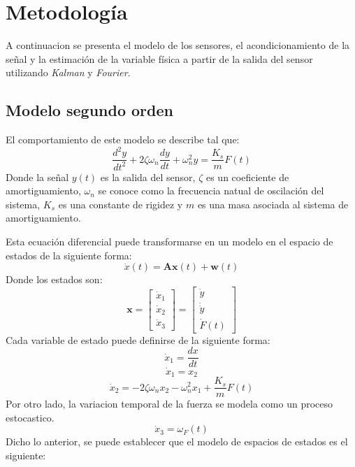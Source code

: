 \documentclass[conference]{IEEEtran}
\begin{document}
\section{Metodolog\'ia}

A continuacion se presenta el modelo de los sensores, el acondicionamiento de la se\~nal 
y la estimaci\'on de la variable f\'isica a partir de la salida del sensor utilizando \textit{Kalman} y \textit{Fourier}.


\subsection{Modelo segundo orden}


El comportamiento de este modelo se describe tal que:
\begin{equation}
	\frac{d^2y}{dt^2} + 2\zeta\omega_n \frac{dy}{dt} + \omega_n^2 y = \frac{K_s}{m} F(t)
\end{equation}
Donde la se\~nal $y(t)$ es la salida del sensor, $\zeta$ es un coeficiente de amortiguamiento, $\omega_n$ se conoce como la frecuencia natual de oscilaci\'on del sistema, ${K_s}$ es una constante de rigidez y $m$ es una masa asociada al sistema de amortiguamiento.

Esta ecuaci\'on diferencial puede transformarse en un modelo en el espacio de estados de la siguiente forma:
\[
\dot{x}(t) = \mathbf{A}\mathbf{x}(t) + \mathbf{w}(t)
\]
Donde los estados son:
\[
	\mathbf{x} = 
	\begin{bmatrix}
	\dot{x}_1 \\
	\dot{x}_2 \\
	\dot{x}_3
	\end{bmatrix} =
	\begin{bmatrix}
		\dot{y} \\
		\dot\dot{y} \\
		\dot{F}(t)
	\end{bmatrix}
\]
Cada variable de estado puede definirse de la siguiente forma:
\[
	\dot{x}_1 = \frac{ dx}{dt}
\]
\[
	\dot{x}_1 = x_2
\]
\[
	\dot{x}_2 = -2\zeta\omega_n x_2 - \omega_n^2x_1 + \frac{K_s}{m}F(t)
\]
Por otro lado, la variacion temporal de la fuerza se modela como un proceso estocastico.
\[
	\dot{x}_3 =  \omega_{F}(t)
\]
Dicho lo anterior, se puede establecer que el modelo de espacios de estados es el siguiente:
\end{document}
